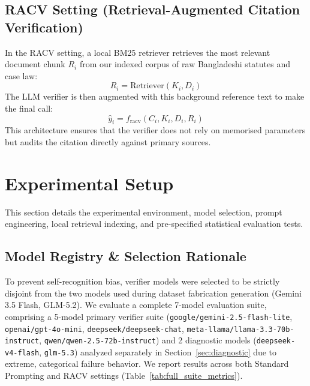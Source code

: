 \documentclass[conference]{IEEEtran}
\begin{document}
\subsection{RACV Setting (Retrieval-Augmented Citation Verification)}
In the RACV setting, a local BM25 retriever \cite{bm25} retrieves the most relevant document chunk $R_i$ from our indexed corpus of raw Bangladeshi statutes and case law:
\begin{equation}
R_i = \text{Retriever}(K_i, D_i)
\end{equation}
The LLM verifier is then augmented with this background reference text to make the final call:
\begin{equation}
\hat{y}_i = f_{\text{racv}}(C_i, K_i, D_i, R_i)
\end{equation}
This architecture ensures that the verifier does not rely on memorised parameters but audits the citation directly against primary sources.

\section{Experimental Setup}
This section details the experimental environment, model selection, prompt engineering, local retrieval indexing, and pre-specified statistical evaluation tests.

\subsection{Model Registry \& Selection Rationale}
To prevent self-recognition bias, verifier models were selected to be strictly disjoint from the two models used during dataset fabrication generation (Gemini 3.5 Flash, GLM-5.2). We evaluate a complete 7-model evaluation suite, comprising a 5-model primary verifier suite (\texttt{google/gemini-2.5-flash-lite}, \texttt{openai/gpt-4o-mini}, \texttt{deepseek/deepseek-chat}, \texttt{meta-llama/llama-3.3-70b-instruct}, \texttt{qwen/qwen-2.5-72b-instruct}) and 2 diagnostic models (\texttt{deepseek-v4-flash}, \texttt{glm-5.3}) analyzed separately in Section~\ref{sec:diagnostic} due to extreme, categorical failure behavior. We report results across both Standard Prompting and RACV settings (Table~\ref{tab:full_suite_metrics}).
\end{document}
